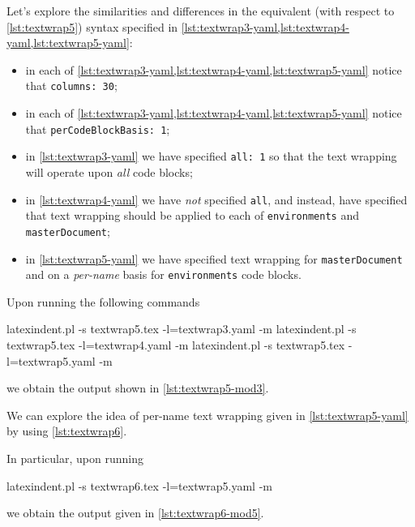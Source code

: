 	Let's explore the similarities and differences in the equivalent (with respect to
	\cref{lst:textwrap5}) syntax specified in \cref{lst:textwrap3-yaml,lst:textwrap4-yaml,lst:textwrap5-yaml}:
	\begin{itemize}
		\item in each of \cref{lst:textwrap3-yaml,lst:textwrap4-yaml,lst:textwrap5-yaml} notice that \texttt{columns: 30};
		\item in each of \cref{lst:textwrap3-yaml,lst:textwrap4-yaml,lst:textwrap5-yaml} notice that \texttt{perCodeBlockBasis: 1};
		\item in \cref{lst:textwrap3-yaml} we have specified \texttt{all: 1} so that the
		      text wrapping will operate upon \emph{all} code blocks;
		\item in \cref{lst:textwrap4-yaml} we have \emph{not} specified
		      \texttt{all}, and instead, have specified that text wrapping should be
		      applied to each of \texttt{environments} and \texttt{masterDocument};
		\item in \cref{lst:textwrap5-yaml} we have specified text wrapping for
		      \texttt{masterDocument} and on a \emph{per-name} basis for
		      \texttt{environments} code blocks.
	\end{itemize}

	Upon running the following commands
	\begin{commandshell}
latexindent.pl -s textwrap5.tex -l=textwrap3.yaml -m
latexindent.pl -s textwrap5.tex -l=textwrap4.yaml -m
latexindent.pl -s textwrap5.tex -l=textwrap5.yaml -m
\end{commandshell}
	we obtain the output shown in \cref{lst:textwrap5-mod3}.


	We can explore the idea of per-name text wrapping given in \cref{lst:textwrap5-yaml} by
	using \cref{lst:textwrap6}.

	\begin{widepage}
	\end{widepage}

	In particular, upon running
	\begin{commandshell}
latexindent.pl -s textwrap6.tex -l=textwrap5.yaml -m
\end{commandshell}
	we obtain the output given in \cref{lst:textwrap6-mod5}.

